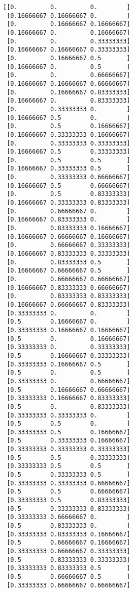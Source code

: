 \documentclass[11pt]{article}
\begin{document}
    \begin{Verbatim}[commandchars=\\\{\}]
[[0.         0.         0.        ]
 [0.16666667 0.16666667 0.        ]
 [0.         0.16666667 0.16666667]
 [0.16666667 0.         0.16666667]
 [0.         0.         0.33333333]
 [0.16666667 0.16666667 0.33333333]
 [0.         0.16666667 0.5       ]
 [0.16666667 0.         0.5       ]
 [0.         0.         0.66666667]
 [0.16666667 0.16666667 0.66666667]
 [0.         0.16666667 0.83333333]
 [0.16666667 0.         0.83333333]
 [0.         0.33333333 0.        ]
 [0.16666667 0.5        0.        ]
 [0.         0.5        0.16666667]
 [0.16666667 0.33333333 0.16666667]
 [0.         0.33333333 0.33333333]
 [0.16666667 0.5        0.33333333]
 [0.         0.5        0.5       ]
 [0.16666667 0.33333333 0.5       ]
 [0.         0.33333333 0.66666667]
 [0.16666667 0.5        0.66666667]
 [0.         0.5        0.83333333]
 [0.16666667 0.33333333 0.83333333]
 [0.         0.66666667 0.        ]
 [0.16666667 0.83333333 0.        ]
 [0.         0.83333333 0.16666667]
 [0.16666667 0.66666667 0.16666667]
 [0.         0.66666667 0.33333333]
 [0.16666667 0.83333333 0.33333333]
 [0.         0.83333333 0.5       ]
 [0.16666667 0.66666667 0.5       ]
 [0.         0.66666667 0.66666667]
 [0.16666667 0.83333333 0.66666667]
 [0.         0.83333333 0.83333333]
 [0.16666667 0.66666667 0.83333333]
 [0.33333333 0.         0.        ]
 [0.5        0.16666667 0.        ]
 [0.33333333 0.16666667 0.16666667]
 [0.5        0.         0.16666667]
 [0.33333333 0.         0.33333333]
 [0.5        0.16666667 0.33333333]
 [0.33333333 0.16666667 0.5       ]
 [0.5        0.         0.5       ]
 [0.33333333 0.         0.66666667]
 [0.5        0.16666667 0.66666667]
 [0.33333333 0.16666667 0.83333333]
 [0.5        0.         0.83333333]
 [0.33333333 0.33333333 0.        ]
 [0.5        0.5        0.        ]
 [0.33333333 0.5        0.16666667]
 [0.5        0.33333333 0.16666667]
 [0.33333333 0.33333333 0.33333333]
 [0.5        0.5        0.33333333]
 [0.33333333 0.5        0.5       ]
 [0.5        0.33333333 0.5       ]
 [0.33333333 0.33333333 0.66666667]
 [0.5        0.5        0.66666667]
 [0.33333333 0.5        0.83333333]
 [0.5        0.33333333 0.83333333]
 [0.33333333 0.66666667 0.        ]
 [0.5        0.83333333 0.        ]
 [0.33333333 0.83333333 0.16666667]
 [0.5        0.66666667 0.16666667]
 [0.33333333 0.66666667 0.33333333]
 [0.5        0.83333333 0.33333333]
 [0.33333333 0.83333333 0.5       ]
 [0.5        0.66666667 0.5       ]
 [0.33333333 0.66666667 0.66666667]

\end{Verbatim}
\end{document}

